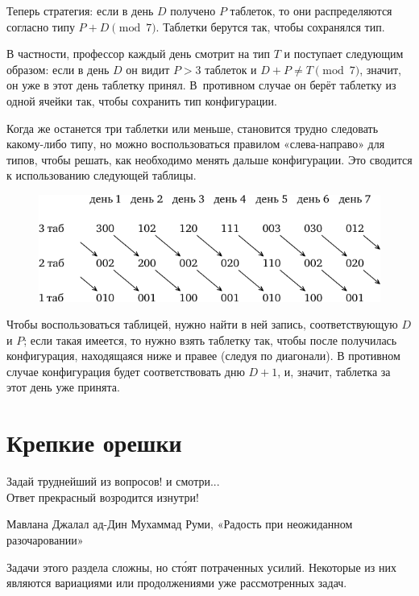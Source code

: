 \documentclass[twoside]{book}
\begin{document}
Теперь стратегия: если в день $D$ получено $P$ таблеток, то они распределяются согласно типу $P+D \pmod 7$.
Таблетки берутся так, чтобы сохранялся тип.

В частности, профессор каждый день смотрит на тип $T$ и поступает следующим образом:
если в день $D$ он видит $P>3$ таблеток и $D+P\ne T\pmod 7$, значит, он уже в этот день таблетку принял.
В~противном случае он берёт таблетку из одной ячейки так, чтобы сохранить тип конфигурации.

Когда же останется три таблетки или меньше, становится трудно следовать какому-либо типу, но можно воспользоваться правилом «слева-направо» для типов, чтобы решать, как необходимо менять дальше конфигурации.
Это сводится к использованию следующей таблицы.

\begin{figure}[!ht]
\centering
\includegraphics{mp/wink-26}
\end{figure}


Чтобы воспользоваться таблицей, нужно найти в ней запись, соответствующую $D$ и $P$;
если такая имеется, то нужно взять таблетку так, чтобы после получилась конфигурация, находящаяся ниже и правее (следуя по диагонали).
В противном случае конфигурация будет соответствовать дню $D+1$, и, значит, таблетка за этот день уже принята.

\chapter{Крепкие орешки}

\setlength{\epigraphwidth}{.55\textwidth}
\epigraph{Задай  труднейший  из  вопросов!  и  смотри...\\
Ответ  прекрасный  возродится  изнутри!\vspace{1ex}}{Мавлана Джалал ад-Дин Мухаммад Руми, «Радость   при   неожиданном разочаровании»
}

Задачи этого раздела сложны, но ст\'{о}ят потраченных усилий.
Некоторые из них являются вариациями или продолжениями уже рассмотренных задач.
\end{document}
